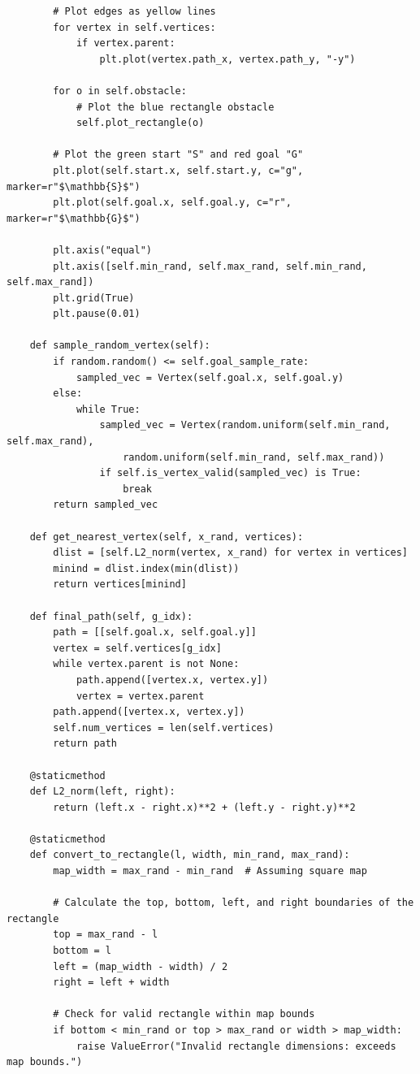 \documentclass{article}
\begin{document}
\begin{verbatim}
        # Plot edges as yellow lines
        for vertex in self.vertices:
            if vertex.parent:
                plt.plot(vertex.path_x, vertex.path_y, "-y")

        for o in self.obstacle:
            # Plot the blue rectangle obstacle
            self.plot_rectangle(o)

        # Plot the green start "S" and red goal "G"
        plt.plot(self.start.x, self.start.y, c="g", marker=r"$\mathbb{S}$")
        plt.plot(self.goal.x, self.goal.y, c="r", marker=r"$\mathbb{G}$")

        plt.axis("equal")
        plt.axis([self.min_rand, self.max_rand, self.min_rand, self.max_rand])
        plt.grid(True)
        plt.pause(0.01)

    def sample_random_vertex(self):
        if random.random() <= self.goal_sample_rate:
            sampled_vec = Vertex(self.goal.x, self.goal.y)
        else: 
            while True:
                sampled_vec = Vertex(random.uniform(self.min_rand, self.max_rand),
                    random.uniform(self.min_rand, self.max_rand))
                if self.is_vertex_valid(sampled_vec) is True:
                    break
        return sampled_vec

    def get_nearest_vertex(self, x_rand, vertices):
        dlist = [self.L2_norm(vertex, x_rand) for vertex in vertices]
        minind = dlist.index(min(dlist))
        return vertices[minind]

    def final_path(self, g_idx):
        path = [[self.goal.x, self.goal.y]]
        vertex = self.vertices[g_idx]
        while vertex.parent is not None:
            path.append([vertex.x, vertex.y])
            vertex = vertex.parent
        path.append([vertex.x, vertex.y])
        self.num_vertices = len(self.vertices)
        return path

    @staticmethod
    def L2_norm(left, right):
        return (left.x - right.x)**2 + (left.y - right.y)**2

    @staticmethod
    def convert_to_rectangle(l, width, min_rand, max_rand):
        map_width = max_rand - min_rand  # Assuming square map

        # Calculate the top, bottom, left, and right boundaries of the rectangle
        top = max_rand - l
        bottom = l
        left = (map_width - width) / 2
        right = left + width

        # Check for valid rectangle within map bounds
        if bottom < min_rand or top > max_rand or width > map_width:
            raise ValueError("Invalid rectangle dimensions: exceeds map bounds.")


\end{verbatim}
\end{document}
